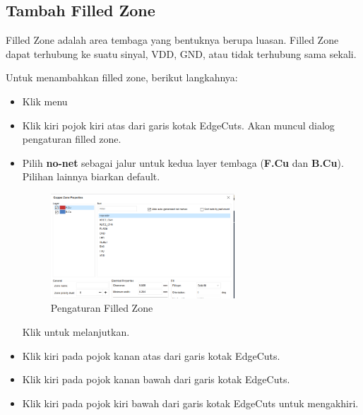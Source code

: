 \documentclass[12pt]{book}
\begin{document}
	\subsection{Tambah Filled Zone}

	Filled Zone adalah area tembaga yang bentuknya berupa luasan. Filled Zone dapat terhubung
	ke suatu sinyal, VDD, GND, atau tidak terhubung sama sekali.

	Untuk menambahkan filled zone, berikut langkahnya:
	\begin{itemize}
		\item Klik menu 
		\item Klik kiri pojok kiri atas dari garis kotak EdgeCuts.
		Akan muncul dialog pengaturan filled zone.
		\item Pilih \textbf{no-net} sebagai jalur untuk kedua layer tembaga (\textbf{F.Cu }dan \textbf{B.Cu}).
		Pilihan lainnya biarkan default.

		\begin{figure}[!ht]
			\centering
			\includegraphics[width=0.65\textwidth]{images/pcb/pcb_21}
			\caption{Pengaturan Filled Zone}
		\end{figure}

		Klik  untuk melanjutkan.

		\newpage
		\item Klik kiri pada pojok kanan atas dari garis kotak EdgeCuts.
		\item Klik kiri pada pojok kanan bawah dari garis kotak EdgeCuts.
		\item Klik kiri pada pojok kiri bawah dari garis kotak EdgeCuts untuk mengakhiri.


\end{itemize}
\end{document}

